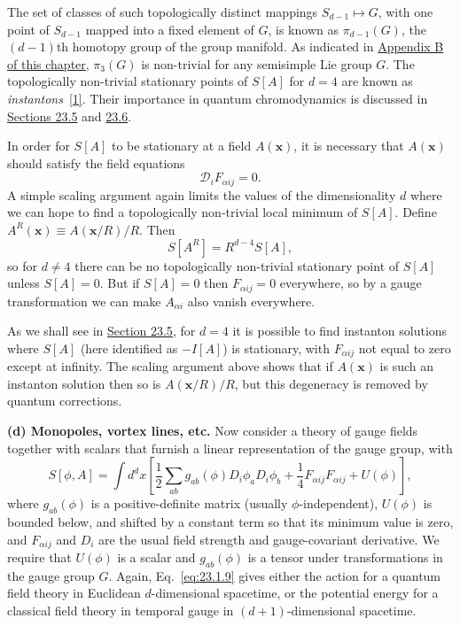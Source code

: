 The set of classes of such topologically distinct mappings
$S_{d-1}\mapsto G$, with one point of $S_{d-1}$ mapped into a fixed element
of $G$, is known as $\pi_{d-1}(G)$, the $(d-1)$th homotopy group of the
group manifold. As indicated in
\hyperref[app:23.B]{Appendix B of this chapter}, $\pi_3(G)$ is non-trivial
for any semisimple Lie group $G$. The topologically non-trivial stationary
points of $S[A]$ for $d=4$ are known as
\emph{instantons}~\hyperref[ch23-ref-1]{[1]}. Their importance in quantum
chromodynamics is discussed in \hyperref[sec:23.5]{Sections 23.5} and
\hyperref[sec:23.6]{23.6}.

In order for $S[A]$ to be stationary at a field $A(\mathbf{x})$, it is
necessary that $A(\mathbf{x})$ should satisfy the field equations
\begin{equation}
 \mathcal D_iF_{\alpha ij}=0.
 \tag{23.1.8}\label{eq:23.1.8}
\end{equation}
A simple scaling argument again limits the values of the dimensionality $d$
where we can hope to find a topologically non-trivial local minimum of
$S[A]$. Define $A^R(\mathbf{x})\equiv A(\mathbf{x}/R)/R$. Then
\[
 S[A^R]=R^{d-4}S[A],
\]
so for $d\ne4$ there can be no topologically non-trivial stationary point of
$S[A]$ unless $S[A]=0$. But if $S[A]=0$ then
$F_{\alpha ij}=0$ everywhere, so by a gauge transformation we can make
$A_{\alpha i}$ also vanish everywhere.

As we shall see in \hyperref[sec:23.5]{Section 23.5}, for $d=4$ it is
possible to find instanton solutions where $S[A]$ (here identified as
$-I[A]$) is stationary, with $F_{\alpha ij}$ not equal to zero except at
infinity. The scaling argument above shows that if $A(\mathbf{x})$ is such
an instanton solution then so is $A(\mathbf{x}/R)/R$, but this degeneracy
is removed by quantum corrections.

\noindent\textbf{(d) Monopoles, vortex lines, etc.} Now consider a theory of
gauge fields together with scalars that furnish a linear representation of
the gauge group, with
\begin{equation}
 S[\phi,A]=\int d^d x\left[
  \frac{1}{2}\sum_{ab}g_{ab}(\phi)D_i\phi_aD_i\phi_b
  +\frac{1}{4}F_{\alpha ij}F_{\alpha ij}+U(\phi)
 \right],
 \tag{23.1.9}\label{eq:23.1.9}
\end{equation}
where $g_{ab}(\phi)$ is a positive-definite matrix (usually
$\phi$-independent), $U(\phi)$ is bounded below, and shifted by a constant
term so that its minimum value is zero, and $F_{\alpha ij}$ and $D_i$ are
the usual field strength and gauge-covariant derivative. We require that
$U(\phi)$ is a scalar and $g_{ab}(\phi)$ is a tensor under transformations
in the gauge group $G$. Again, Eq.~\eqref{eq:23.1.9} gives either the action
for a quantum field theory in Euclidean $d$-dimensional spacetime, or the
potential energy for a classical field theory in temporal gauge in
$(d+1)$-dimensional spacetime.


